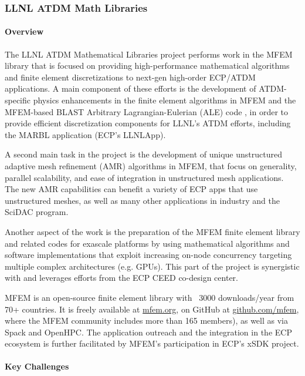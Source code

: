 \subsubsection{LLNL ATDM Math Libraries}

\paragraph{Overview}

The LLNL ATDM Mathematical Libraries project performs work in the MFEM library
\cite{MFEM} that is focused on providing high-performance mathematical algorithms
and finite element discretizations to next-gen high-order ECP/ATDM
applications. A main component of these efforts is the development of
ATDM-specific physics enhancements in the finite element algorithms in MFEM and
the MFEM-based BLAST Arbitrary Lagrangian-Eulerian (ALE) code \cite{BLAST}, in
order to provide efficient discretization components for LLNL's ATDM efforts,
including the MARBL application (ECP's LLNLApp).

A second main task in the project is the development of unique unstructured
adaptive mesh refinement (AMR) algorithms in MFEM, that focus on generality,
parallel scalability, and ease of integration in unstructured mesh
applications. The new AMR capabilities can benefit a variety of ECP apps that
use unstructured meshes, as well as many other applications in industry and the
SciDAC program.

Another aspect of the work is the preparation of the MFEM finite element library
and related codes for exascale platforms by using mathematical algorithms and
software implementations that exploit increasing on-node concurrency targeting
multiple complex architectures (e.g. GPUs). This part of the project is
synergistic with and leverages efforts from the ECP CEED co-design center.

MFEM is an open-source finite element library with ~3000 downloads/year from 70+
countries. It is freely available at \url{mfem.org}, on GitHub
at \url{github.com/mfem}, where the MFEM community includes more than 165
members), as well as via Spack and OpenHPC. The application outreach and the
integration in the ECP ecosystem is further facilitated by MFEM's participation
in ECP's xSDK project.

\paragraph{Key Challenges}

